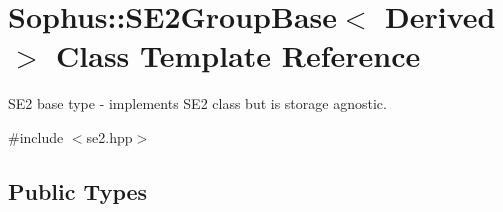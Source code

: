 \hypertarget{class_sophus_1_1_s_e2_group_base}{}\section{Sophus\+:\+:S\+E2\+Group\+Base$<$ Derived $>$ Class Template Reference}
\label{class_sophus_1_1_s_e2_group_base}


S\+E2 base type -\/ implements S\+E2 class but is storage agnostic.  




{\ttfamily \#include $<$se2.\+hpp$>$}

\subsection*{Public Types}
